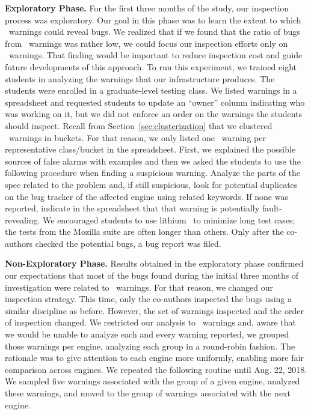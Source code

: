 \documentclass[10pt,conference,anonymous]{IEEEtran}
\begin{document}
\vspace{1ex}
\noindent\textbf{Exploratory Phase.} For the first three months of the
study, our inspection process was exploratory.  Our goal in this phase
was to learn the extent to which \lo\ warnings could reveal bugs. We
realized that if we found that the ratio of bugs from \lo\ warnings
was rather low, we could focus our inspection efforts only on
\hi\ warnings. That finding would be important to reduce inspection
cost and guide future developments of this approach. To run this
experiment, we trained eight students in analyzing the warnings that
our infrastructure produces. The students were enrolled in a
graduate-level testing class. We listed warnings in a spreadsheet and
requested students to update an ``owner'' column indicating who was
working on it, but we did not enforce an order on the warnings the
students should inspect. Recall from Section~\ref{sec:clusterization}
that we clustered \lo\ warnings in buckets. For that reason, we only
listed one \lo\ warning per representative class/bucket in the
spreadsheet. First, we explained the possible sources of false alarms
with examples and then we asked the students to use the following
procedure when finding a suspicious warning. Analyze the parts of the
spec related to the problem and, if still suspicious, look for
potential duplicates on the bug tracker of the affected engine using
related keywords. If none was reported, indicate in the spreadsheet
that that warning is potentially fault-revealing. We encouraged
students to use lithium~\cite{lithium} to minimize long test cases;
the tests from the Mozilla suite are often longer than others. Only
after the co-authors checked the potential bugs, a bug report was
filed.

\vspace{1ex}
\noindent\textbf{Non-Exploratory Phase.} Results obtained in the
exploratory phase confirmed our expectations that most of the bugs
found during the initial three months of investigation were related to
\hi\ warnings. For that reason, we changed our inspection
strategy. This time, only the co-authors inspected the bugs using a
similar discipline as before. However, the set of warnings inspected
and the order of inspection changed. We restricted our analysis to
\hi\ warnings and, aware that we would be unable to analyze each and
every warning reported, we grouped those warnings per engine,
analyzing each group in a round-robin fashion. The rationale was to
give attention to each engine more uniformly, enabling more fair
comparison across engines. We repeated the following routine until
Aug. 22, 2018. We sampled five warnings associated with the group of a
given engine, analyzed these warnings, and moved to the group of
warnings associated with the next engine.
\end{document}

